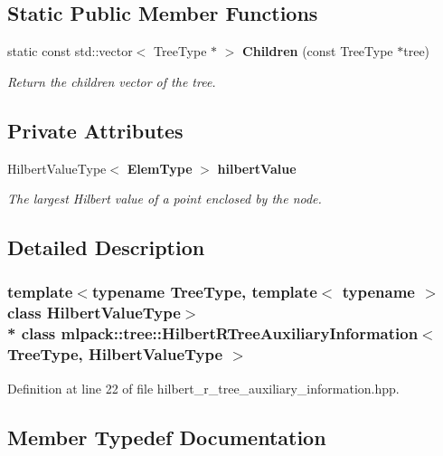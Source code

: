\subsection*{Static Public Member Functions}
\begin{DoxyCompactItemize}
\item 
static const std\+::vector$<$ Tree\+Type $\ast$ $>$ {\bf Children} (const Tree\+Type $\ast$tree)
\begin{DoxyCompactList}\small\item\em Return the children vector of the tree. \end{DoxyCompactList}\end{DoxyCompactItemize}
\subsection*{Private Attributes}
\begin{DoxyCompactItemize}
\item 
Hilbert\+Value\+Type$<$ {\bf Elem\+Type} $>$ {\bf hilbert\+Value}
\begin{DoxyCompactList}\small\item\em The largest Hilbert value of a point enclosed by the node. \end{DoxyCompactList}\end{DoxyCompactItemize}


\subsection{Detailed Description}
\subsubsection*{template$<$typename Tree\+Type, template$<$ typename $>$ class Hilbert\+Value\+Type$>$\\*
class mlpack\+::tree\+::\+Hilbert\+R\+Tree\+Auxiliary\+Information$<$ Tree\+Type, Hilbert\+Value\+Type $>$}



Definition at line 22 of file hilbert\+\_\+r\+\_\+tree\+\_\+auxiliary\+\_\+information.\+hpp.



\subsection{Member Typedef Documentation}

